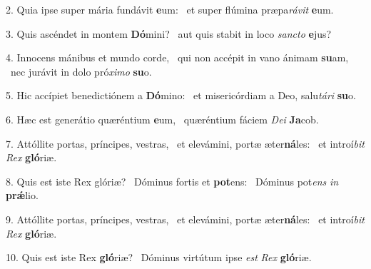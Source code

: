 2. Quia ipse super mária fundávit \textbf{e}um: \ast\  et super flúmina præpa\textit{rá}\textit{vit} \textbf{e}um.\

3. Quis ascéndet in montem \textbf{Dó}mini? \ast\  aut quis stabit in loco \textit{sanc}\textit{to} \textbf{e}jus?\

4. Innocens mánibus et mundo corde, \dag\  qui non accépit in vano ánimam \textbf{su}am, \ast\  nec jurávit in dolo pró\textit{xi}\textit{mo} \textbf{su}o.\

5. Hic accípiet benedictiónem a \textbf{Dó}mino: \ast\  et misericórdiam a Deo, salu\textit{tá}\textit{ri} \textbf{su}o.\

6. Hæc est generátio quæréntium \textbf{e}um, \ast\  quæréntium fáciem \textit{De}\textit{i} \textbf{Ja}cob.\

7. Attóllite portas, príncipes, vestras, \dag\  et elevámini, portæ æter\textbf{ná}les: \ast\  et introí\textit{bit} \textit{Rex} \textbf{gló}riæ.\

8. Quis est iste Rex glóriæ? \dag\  Dóminus fortis et \textbf{pot}ens: \ast\  Dóminus pot\textit{ens} \textit{in} \textbf{prǽ}lio.\

9. Attóllite portas, príncipes, vestras, \dag\  et elevámini, portæ æter\textbf{ná}les: \ast\  et introí\textit{bit} \textit{Rex} \textbf{gló}riæ.\

10. Quis est iste Rex \textbf{gló}riæ? \ast\  Dóminus virtútum ipse \textit{est} \textit{Rex} \textbf{gló}riæ.\


